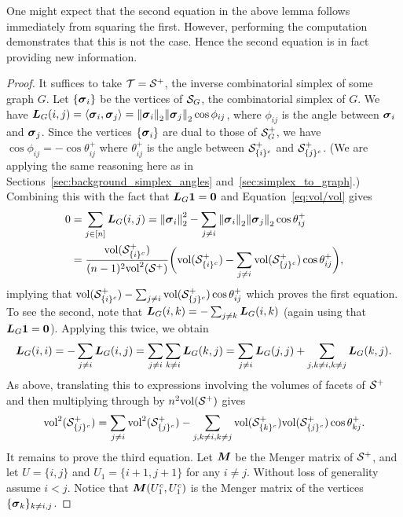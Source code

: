 \begin{remark}
	One might expect that the second equation in the above lemma follows immediately from squaring the first. However, performing the computation demonstrates that this is not the case. Hence the second equation is in  fact providing new information. 
\end{remark}
\begin{proof}
	It suffices to take $\mathcal{T}=\mathcal{S}^+$, the  inverse combinatorial simplex of some graph $G$.  Let $\{\vb*{\sigma}_i\}$ be the vertices of $\mathcal{S}_G$, the combinatorial simplex of $G$. 	
	We have $\vb*{L}_G(i,j)=\langle\vb*{\sigma}_i,\vb*{\sigma}_j\rangle = \norm{\vb*{\sigma}_i}_2\norm{\vb*{\sigma}_j}_2\cos\phi_{ij}$, where $\phi_{ij}$ is the angle between $\vb*{\sigma}_i$ and $\vb*{\sigma}_j$. Since the vertices $\{\vb*{\sigma}_i\}$ are  dual to those of $\mathcal{S}^+_G$, we have $\cos\phi_{ij}=-\cos\theta^+_{ij}$ where $\theta^+_{ij}$ is the angle between $\mathcal{S}^+_{\{i\}^c}$ and $\mathcal{S}^+_{\{j\}^c}$. (We are applying the same reasoning here as in Sections~\ref{sec:background_simplex_angles} and~\ref{sec:simplex_to_graph}.) Combining this with the fact that $\vb*{L}_G\vb{1}=\vb{0}$ and Equation~\eqref{eq:vol/vol} gives
	\begin{align*}
	0 &= \sum_{j\in[n]} \vb*{L}_G(i,j) = \norm{\vb*{\sigma}_i}_2^2 - \sum_{j\neq i}\norm{\vb*{\sigma}_i}_2\norm{\vb*{\sigma}_j}_2\cos\theta_{ij}^+ \\
	&= \frac{\textnormal{vol}(\mathcal{S}_{\{i\}^c}^+)}{(n-1)^2\textnormal{vol}^2(\mathcal{S}^+)} \bigg(\textnormal{vol}(\mathcal{S}^+_{\{i\}^c}) - \sum_{j\neq i}\textnormal{vol}(\mathcal{S}_{\{j\}^c}^+)\cos\theta_{ij}^+\bigg),
	\end{align*}
	implying that $\textnormal{vol}(\mathcal{S}^+_{\{i\}^c}) - \sum_{j\neq i}\textnormal{vol}(\mathcal{S}_{\{j\}^c}^+)\cos\theta_{ij}^+$ which proves the first equation. To see the second,  note that $\vb*{L}_G(i,k)=-\sum_{j\neq k}\vb*{L}_G(i,k)$  (again using that $\vb*{L}_G\vb{1}=\vb{0}$). Applying  this twice, we obtain 
	\[\vb*{L}_G(i,i) = -\sum_{j\neq i}\vb*{L}_G(i,j) = \sum_{j\neq i}\sum_{k\neq i}\vb*{L}_G(k,j) = \sum_{j\neq i}\vb*{L}_G(j,j) + \sum_{j,k\neq i,k\neq j}\vb*{L}_G(k,j).\] 
	As above,  translating this to expressions involving the volumes of facets of $\mathcal{S}^+$ and then multiplying through by $n^2\textnormal{vol}(\mathcal{S}^+)$ gives  
	\begin{equation*}
	\textnormal{vol}^2(\mathcal{S}_{\{j\}^c}^+) = \sum_{j\neq i}\textnormal{vol}^2(\mathcal{S}_{\{j\}^c}^+) - \sum_{j,k\neq i,k\neq j} \textnormal{vol}(\mathcal{S}_{\{k\}^c}^+)\textnormal{vol}(\mathcal{S}_{\{j\}^c}^+)\cos\theta_{kj}^+. 
	\end{equation*}
	It remains to  prove  the  third equation.  Let ${\vb*{M}}$ be  the Menger matrix of $\mathcal{S}^+$, and  let $U=\{i,j\}$  and  $U_1=\{i+1,j+1\}$ for any $i\neq j$. Without loss of generality assume  $i<j$. 
	Notice that ${\vb*{M}}(U_1^c,U_1^c)$ is the Menger matrix of the vertices $\{\vb*{\sigma}_k\}_{k\neq i,j}$. 

\end{proof}
